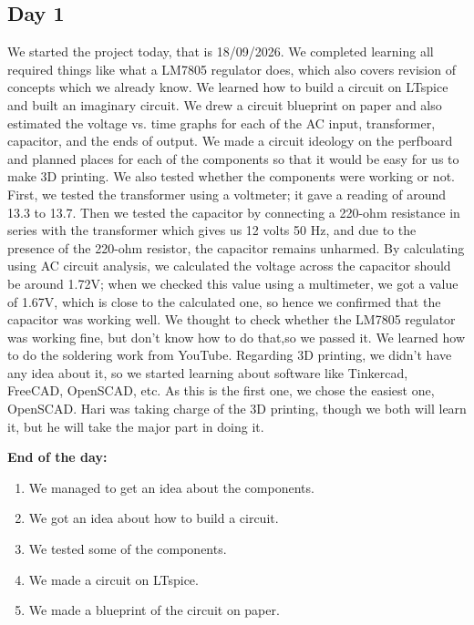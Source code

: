 \documentclass[11pt, a4paper]{article}
\begin{document}
\subsection*{Day 1}
We started the project today, that is 18/09/2026. We completed learning all required things like what a LM7805 regulator does,
which also covers revision of concepts which we already know. We learned how to build a circuit on LTspice and built an imaginary 
circuit. We drew a circuit blueprint on paper and also estimated the voltage vs. time graphs for each of the AC input, transformer, capacitor, and 
the ends of output. We made a circuit ideology on the perfboard and planned places for each of the components so that it would be easy for 
us to make 3D printing. We also tested whether the components were working or not. First, we tested the transformer using a voltmeter; it gave
a reading of around 13.3 to 13.7. Then we tested the capacitor by connecting a 220-ohm resistance in series with the transformer which gives us 12 volts 
50 Hz, and due to the presence of the 220-ohm resistor, the capacitor remains unharmed. By calculating using AC circuit analysis, we calculated the voltage
across the capacitor should be around 1.72V; when we checked this value using a multimeter, we got a value of 1.67V, which is close to the calculated
one, so hence we confirmed that the capacitor was working well. We thought to check whether the LM7805 regulator was working fine, but don't know how to do that,so we passed it.
 We learned how to do the soldering work from YouTube. Regarding 3D printing, we didn't have any idea about it, so we started learning about software like Tinkercad, FreeCAD,
OpenSCAD, etc. As this is the first one, we chose the easiest one, OpenSCAD. Hari was taking charge of the 3D printing, though we both will
learn it, but he will take the major part in doing it. 

\noindent\textbf{End of the day:}
\begin{enumerate}
    \item We managed to get an idea about the components.
    \item We got an idea about how to build a circuit.
    \item We tested some of the components.
    \item We made a circuit on LTspice.
    \item We made a blueprint of the circuit on paper.
\end{enumerate}
\end{document}
